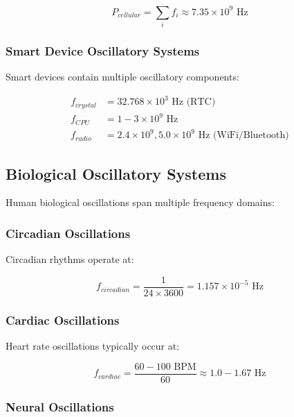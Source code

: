 \documentclass[12pt]{article}
\begin{document}
\begin{equation}
P_{cellular} = \sum_{i} f_i \approx 7.35 \times 10^9 \text{ Hz}
\end{equation}

\subsubsection{Smart Device Oscillatory Systems}

Smart devices contain multiple oscillatory components:

\begin{align}
f_{crystal} &= 32.768 \times 10^3 \text{ Hz (RTC)} \\
f_{CPU} &= 1-3 \times 10^9 \text{ Hz} \\
f_{radio} &= 2.4 \times 10^9, 5.0 \times 10^9 \text{ Hz (WiFi/Bluetooth)}
\end{align}

\subsection{Biological Oscillatory Systems}

Human biological oscillations span multiple frequency domains:

\subsubsection{Circadian Oscillations}

Circadian rhythms operate at:

\begin{equation}
f_{circadian} = \frac{1}{24 \times 3600} = 1.157 \times 10^{-5} \text{ Hz}
\end{equation}

\subsubsection{Cardiac Oscillations}

Heart rate oscillations typically occur at:

\begin{equation}
f_{cardiac} = \frac{60-100 \text{ BPM}}{60} \approx 1.0-1.67 \text{ Hz}
\end{equation}

\subsubsection{Neural Oscillations}
\end{document}
